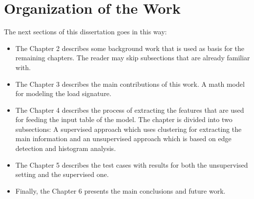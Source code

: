 \section{Organization of the Work}

The next sections of this dissertation goes in this way:
\begin{itemize}
\item The Chapter 2 describes some background work that is used as basis for the remaining chapters. The reader may skip subsections that are already familiar with. 
\item The Chapter 3 describes the main contributions of this work. A math model for modeling the load signature. 
\item The Chapter 4 describes the process of extracting the features that are used for feeding the input table of the model. The chapter is divided into two subsections: A supervised approach which uses clustering for extracting the main information and an unsupervised approach which is based on edge detection and histogram analysis.
\item The Chapter 5 describes the test cases with results for both the unsupervised setting and the supervised one. 
\item Finally, the Chapter 6 presents the main conclusions and future work. 
\end{itemize}